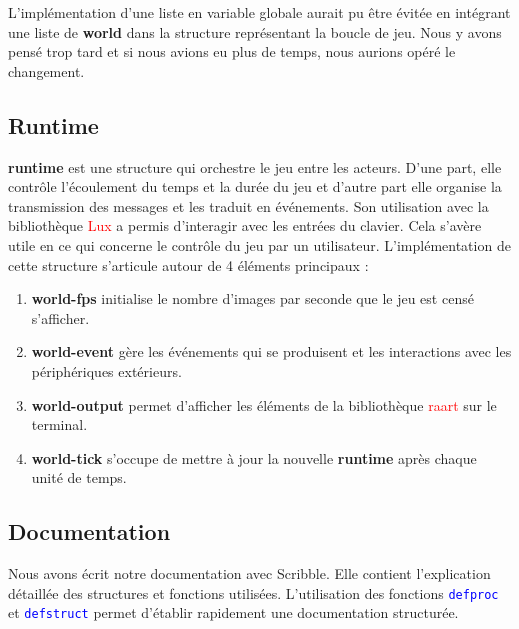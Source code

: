 \documentclass{article}
\begin{document}
L'implémentation d'une liste en variable globale aurait pu être évitée en intégrant une liste de \textbf{world} dans la structure représentant la boucle de jeu. Nous y avons pensé trop tard et si nous avions eu plus de temps, nous aurions opéré le changement.

\subsection{Runtime}
\textbf{runtime} est une structure qui orchestre le jeu entre les acteurs. D'une part, elle contrôle l'écoulement du temps et la durée du jeu et d'autre part elle organise la transmission des messages et les traduit en événements. Son utilisation avec la bibliothèque  \textcolor{red}{Lux} a permis d'interagir avec les entrées du clavier. Cela s'avère utile en ce qui concerne le contrôle du jeu par un utilisateur. L'implémentation de cette structure s'articule autour de 4 éléments principaux :

\begin{enumerate}
\item \textbf{world-fps} initialise le nombre d'images par seconde que le jeu est censé s'afficher.  
\item \textbf{world-event} gère les événements qui se produisent et les interactions avec les périphériques extérieurs.
 \item \textbf{world-output} permet d'afficher les éléments de la bibliothèque \textcolor{red}{raart} sur le terminal.  
 \item \textbf{world-tick} s'occupe de mettre à jour la nouvelle \textbf{runtime} après chaque unité de temps.

\end{enumerate}

\subsection{Documentation}
Nous avons écrit notre documentation avec Scribble. Elle contient l'explication détaillée des structures et fonctions utilisées. L'utilisation des fonctions \textcolor{blue}{\lstinline{defproc}} et \textcolor{blue}{\lstinline{defstruct}} permet d'établir rapidement une documentation structurée.

\end{document}
